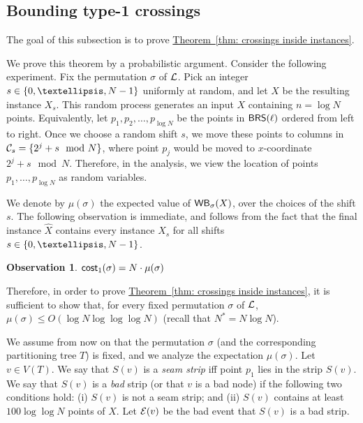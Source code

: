 \documentclass[11pt]{article}
\numberwithin{equation}{section}
\theoremstyle{definition}
\theoremstyle{plain}
\newcommand{\expref}[2]{\hyperref[#2]{#1~\ref{#2}}}
\newtheorem{myobs}[theorem]{Observation}
\begin{document}
%


%

%

%

%

%

%

%
%

%

%
%


%
%
%
\subsection{Bounding type-1 crossings}\label{subsec: type 1 crossings}

%
%
%

The goal of this subsection is to prove \expref{Theorem}{thm: crossings inside instances}.

%
%
%


We prove this theorem by a probabilistic argument. 
Consider the following experiment. 
Fix the permutation $\sigma$ of ${\mathcal L}$.  
%
Pick an integer $s \in \set{0,\ldots, N-1}$ uniformly at random, and let $X$ be the resulting instance $X_s$. 
This random process generates an input $X$ containing $n = \log N$ points.
Equivalently, let $p_1, p_2, \ldots, p_{\log N}$ be the points in $\mathsf{BRS}(\ell)$ ordered from left to right.  
Once we choose a random shift $s$, we move these points  to columns in ${\mathcal C}_s = \{2^j + s \mod N \}$, where point $p_j$ would be moved to $x$-coordinate $2^j + s \mod N$. 
Therefore, in the analysis, we view the location of points $p_1,\ldots, p_{\log N}$ as random variables.
  
We denote by $\mu(\sigma)$ the expected value of $\mathsf{WB}_{\sigma}(X)$, over the choices of the shift $s$. The following observation is immediate, and follows from the fact that the final instance $\hat X$ contains every instance $X_s$ for all shifts $s\in \set{0,\ldots,N-1}$.

\begin{myobs}
$\mathsf{cost}_1(\sigma) = N \cdot \mu(\sigma)$ 
\end{myobs}  
%

Therefore, in order to prove \expref{Theorem}{thm: crossings inside instances}, it is sufficient to show that, for every fixed permutation $\sigma$ of ${\mathcal L}$, $\mu(\sigma)\leq  O(\log N\log\log\log N)$ (recall that $N^*=N\log N$).

%
%


We assume from now on that the permutation $\sigma$ (and the corresponding partitioning tree $T$) is fixed, and we analyze the expectation $\mu(\sigma)$.
Let $v \in V(T)$. We say that $S(v)$ is a \emph{seam strip} iff point $p_1$ lies in the strip $S(v)$. 
We say that $S(v)$ is a \emph{bad} strip (or that $v$ is a bad node) if the following two conditions hold: (i) $S(v)$ is not a seam strip; and (ii) $S(v)$ contains at least $100\log\log N$ points of $X$. 
Let ${\cal{E}}(v)$ be the bad event that $S(v)$ is a bad strip.
  
\end{document}
